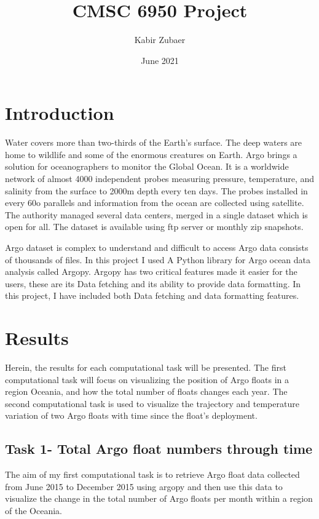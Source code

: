 \documentclass[12pt]{article}
\title{CMSC 6950 Project}
\date{June 2021}
\author{Kabir Zubaer}
\begin{document}
\maketitle
\section{Introduction}

Water covers more than two-thirds of the Earth’s surface. The deep waters are home to wildlife and some of the enormous creatures on Earth. Argo brings a solution for oceanographers to monitor the Global Ocean. It is a worldwide network of almost 4000 independent probes measuring pressure, temperature, and salinity from the surface to 2000m depth every ten days. The probes installed in every 60o parallels and information from the ocean are collected using satellite. The authority managed several data centers, merged in a single dataset which is open for all. The dataset is available using ftp server or monthly zip snapshots.

Argo dataset is complex to understand and difficult to access Argo data consists of thousands of files. In this project I used A Python library for Argo ocean data analysis called Argopy. Argopy has two critical features made it easier for the users, these are its Data fetching and its ability to provide data formatting. In this project, I have included both Data fetching and data formatting features. 

\section{Results}

Herein, the results for each computational task will be presented. The first computational task will focus on visualizing the position of Argo floats in a region Oceania,  and how the total number of floats changes each year. The second computational task is used to visualize the trajectory and temperature variation of two Argo floats with time since the float's deployment.
  
\subsection{Task 1- Total Argo float numbers through time}

The aim of my first computational task is to retrieve Argo float data collected from June 2015 to December 2015 using argopy and then use this data to visualize the change in the total number of Argo floats per month within a region of the Oceania.  
\end{document}
